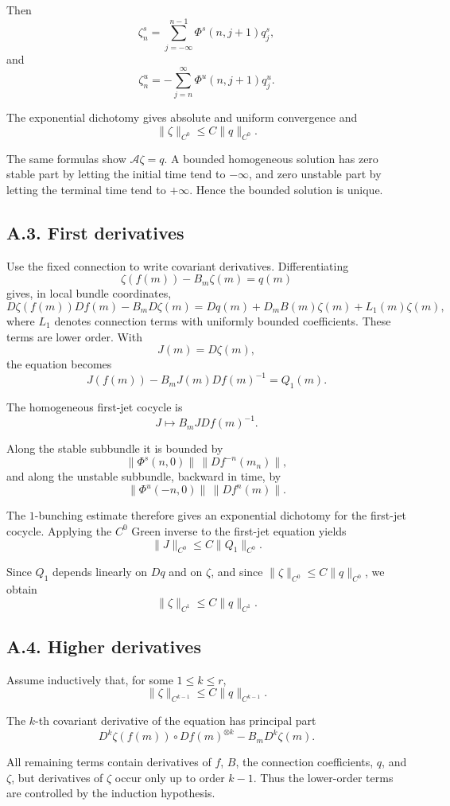 \documentclass[12pt,a4paper]{article}
\theoremstyle{plain}
\numberwithin{equation}{section}
\numberwithin{theorem}{section}
\begin{document}
Then
\[
\zeta_n^s
=
\sum_{j=-\infty}^{n-1}
\Phi^s(n,j+1)q_j^s,
\]
and
\[
\zeta_n^u
=
-
\sum_{j=n}^{\infty}
\Phi^u(n,j+1)q_j^u.
\]

The exponential dichotomy gives absolute and uniform convergence and
\[
\|\zeta\|_{C^0}\le C\|q\|_{C^0}.
\]

The same formulas show $\mathcal A\zeta=q$. A bounded homogeneous solution has zero stable part by letting the initial time tend to $-\infty$, and zero unstable part by letting the terminal time tend to $+\infty$. Hence the bounded solution is unique.

\subsection{A.3. First derivatives}

Use the fixed connection to write covariant derivatives. Differentiating
\[
\zeta(f(m))-B_m\zeta(m)=q(m)
\]
gives, in local bundle coordinates,
\[
D\zeta(f(m))Df(m)-B_mD\zeta(m)=Dq(m)+D_mB(m)\zeta(m)+L_1(m)\zeta(m),
\]
where $L_1$ denotes connection terms with uniformly bounded coefficients. These terms are lower order. With
\[
J(m)=D\zeta(m),
\]
the equation becomes
\[
J(f(m))-B_mJ(m)Df(m)^{-1}=Q_1(m).
\]

The homogeneous first-jet cocycle is
\[
J\mapsto B_mJDf(m)^{-1}.
\]

Along the stable subbundle it is bounded by
\[
\|\Phi^s(n,0)\|\,\|Df^{-n}(m_n)\|,
\]
and along the unstable subbundle, backward in time, by
\[
\|\Phi^u(-n,0)\|\,\|Df^n(m)\|.
\]

The $1$-bunching estimate therefore gives an exponential dichotomy for the first-jet cocycle. Applying the $C^0$ Green inverse to the first-jet equation yields
\[
\|J\|_{C^0}
\le
C\|Q_1\|_{C^0}.
\]

Since $Q_1$ depends linearly on $Dq$ and on $\zeta$, and since $\|\zeta\|_{C^0}\le C\|q\|_{C^0}$, we obtain
\[
\|\zeta\|_{C^1}\le C\|q\|_{C^1}.
\]

\subsection{A.4. Higher derivatives}

Assume inductively that, for some $1\le k\le r$,
\[
\|\zeta\|_{C^{k-1}}\le C\|q\|_{C^{k-1}}.
\]

The $k$-th covariant derivative of the equation has principal part
\[
D^k\zeta(f(m))\circ Df(m)^{\otimes k}-B_mD^k\zeta(m).
\]

All remaining terms contain derivatives of $f$, $B$, the connection coefficients, $q$, and $\zeta$, but derivatives of $\zeta$ occur only up to order $k-1$. Thus the lower-order terms are controlled by the induction hypothesis.
\end{document}
